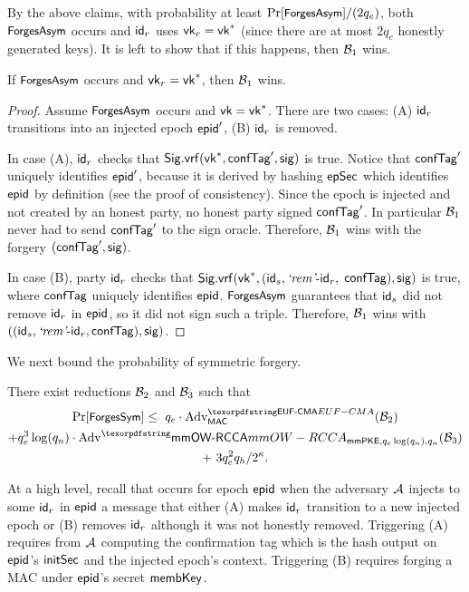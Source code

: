 By the above claims, with probability at least $\Pr[\forgesa]/(2q_e)$, both $\forgesa$ occurs and $\id_r$ uses $\ersvk_r=\ersvk^*$ (since there are at most $2q_e$ honestly generated keys). It is left to show that if this happens, then $\Bdv[1]$ wins.
\begin{claim}
  If $\forgesa$ occurs and $\ersvk_r=\ersvk^*$, then $\Bdv[1]$ wins.
\end{claim}
\begin{proof}
  Assume $\forgesa$ occurs and $\ersvk=\ersvk^*$. There are two cases: (A) $\id_r$ transitions into an injected epoch $\hgnodeid'$, (B) $\id_r$ is removed.

  In case (A), $\id_r$ checks that $\sigvrf(\ersvk^*, \confTag', \sig)$ is true. Notice that $\confTag'$ uniquely identifies $\hgnodeid'$, because it is derived by hashing $\epochSecret$ which identifies $\hgnodeid$ by definition (see the proof of \saik consistency). Since the epoch is injected and not created by an honest party, no honest party signed $\confTag'$. In particular $\Bdv[1]$ never had to send $\confTag'$ to the sign oracle. Therefore, $\Bdv[1]$ wins with the forgery $(\confTag', \sig)$.

  In case (B),  party $\id_r$ checks that $\sigvrf(\ersvk^*, (\id_s, \hglr\md\id_r, $ $\confTag), \sig)$ is true, where $\confTag$ uniquely identifies $\hgnodeid$. $\forgesa$ guarantees that $\id_s$ did not remove $\id_r$ in $\hgnodeid$, so it did not sign such a triple. Therefore, $\Bdv[1]$ wins with $((\id_s, \hglr\md\id_r, \confTag), \sig)$.
\end{proof}

\newcommand{\hybridThreeN}{3$^*$\xspace}
\newcommand{\forgessN}{\forgess\xmath{^*}\xspace}
We next bound the probability of symmetric forgery.
\begin{lemma}
There exist reductions $\Bdv[2]$ and $\Bdv[3]$ such that
\begin{multline*}
    \Pr[\forgess] \leq \  q_e\cdot \textnormal{Adv}^{\ufcma}_\mac(\Bdv[2]) \\+ q_e^3\log(q_n)\cdot \textnormal{Adv}^\mmowrcca_{\mmPKE,q_e\log(q_n),q_n}(\Bdv[3])\\+\  3q_e^2q_h/2^\kappa .
\end{multline*}
\end{lemma}

At a high level, recall that \forgess occurs for epoch $\hgnodeid$ when the adversary $\Adv$ injects to some $\id_r$ in $\hgnodeid$ a message that either (A) makes $\id_r$ transition to a new injected epoch or (B) removes $\id_r$ although it was not honestly removed. Triggering (A) requires from $\Adv$ computing the confirmation tag which is the hash output on $\hgnodeid$'s $\initSecret$ and the injected epoch's context. Triggering (B) requires forging a MAC under $\hgnodeid$'s secret $\membershipKey$.

